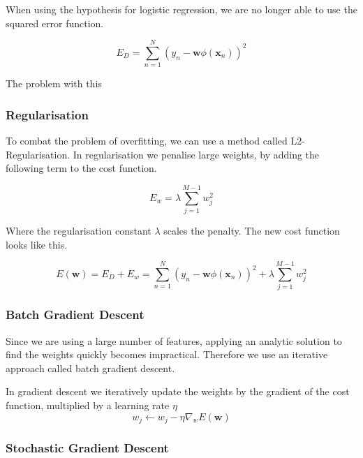 

When using the hypothesis for logistic regression, we are no longer able to use the squared error function.

\[ E_D = \sum_{n=1}^{N} \left(y_n - \textbf{w} \phi(\textbf{x}_n) \right)^2 \] 

The problem with this  




\subsubsection{Regularisation}
To combat the problem of overfitting, we can use a method called L2-Regularisation.
In regularisation we penalise large weights, by adding the following term to the cost function.

\[ E_w = \lambda \sum_{j=1}^{M-1} w_j^2 \]

Where the regularisation constant $\lambda$ scales the penalty. 
The new cost function looks like this.

\[ E(\textbf{w})
  = E_D + E_w 
  = \sum_{n=1}^{N} \left(y_n - \textbf{w} \phi(\textbf{x}_n) \right)^2 + \lambda \sum_{j=1}^{M-1} w_j^2 \]

\begin{flushright}
\cite[online course]{courseraAI}
\end{flushright}

\subsubsection{Batch Gradient Descent}

Since we are using a large number of features, applying an analytic solution to find the weights quickly becomes impractical.
Therefore we use an iterative approach called batch gradient descent.

In gradient descent we iteratively update the weights by the gradient of the cost function, multiplied by a learning rate $\eta$  
\[ w_j \leftarrow w_j - \eta \nabla_w E(\textbf{w}) \]

\subsubsection{Stochastic Gradient Descent}\label{sec:stochastic}

